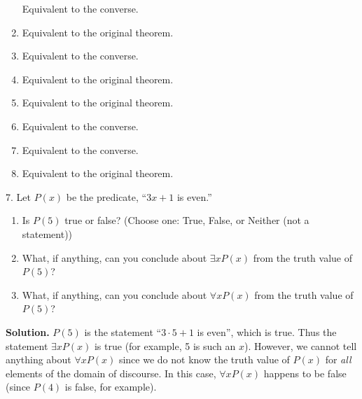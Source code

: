 \documentclass[10pt,]{book}
\theoremstyle{plain}
\theoremstyle{definition}
\theoremstyle{definition}
\numberwithin{equation}{chapter}
\begin{document}
\begin{exerciselist}
\begin{enumerate}[label=(\alph*)]
Equivalent to the converse.%
\item\hypertarget{li-120}{}\hypertarget{p-233}{}%
Equivalent to the original theorem.%
\item\hypertarget{li-121}{}\hypertarget{p-234}{}%
Equivalent to the converse.%
\item\hypertarget{li-122}{}\hypertarget{p-235}{}%
Equivalent to the original theorem.%
\item\hypertarget{li-123}{}\hypertarget{p-236}{}%
Equivalent to the original theorem.%
\item\hypertarget{li-124}{}\hypertarget{p-237}{}%
Equivalent to the converse.%
\item\hypertarget{li-125}{}\hypertarget{p-238}{}%
Equivalent to the converse.%
\item\hypertarget{li-126}{}\hypertarget{p-239}{}%
Equivalent to the original theorem.%
\end{enumerate}
%
\par
\item[7.]\hypertarget{exercise-7}{}\noindent%
\hypertarget{p-240}{}%
Let \(P(x)\) be the predicate, ``\(3x+1\) is even.''%
\par
\hypertarget{p-241}{}%
\leavevmode%
\begin{enumerate}[label=(\alph*)]
\item\hypertarget{li-127}{}\hypertarget{p-242}{}%
Is \(P(5)\) true or false? (Choose one: True, False, or Neither (not a statement))%
\item\hypertarget{li-128}{}\hypertarget{p-243}{}%
What, if anything, can you conclude about \(\exists x P(x)\) from the truth value of \(P(5)\)?%
\par
\hypertarget{p-244}{}%
\par
\begin{itemize}[label=$\odot$,leftmargin=3em,]
\end{itemize}
%
\item\hypertarget{li-129}{}\hypertarget{p-245}{}%
What, if anything, can you conclude about \(\forall x P(x)\) from the truth value of \(P(5)\)?%
\par
\hypertarget{p-246}{}%
\par
\begin{itemize}[label=$\odot$,leftmargin=3em,]
\end{itemize}
%
\end{enumerate}
%
\par
\medskip\noindent%
\textbf{Solution.}\quad \hypertarget{p-247}{}%
\(P(5)\) is the statement ``\(3\cdot 5 + 1\) is even'', which is true.  Thus the statement \(\exists x P(x)\) is true (for example, 5 is such an \(x\)).  However, we cannot tell anything about \(\forall x P(x)\) since we do not know the truth value of \(P(x)\) for \emph{all} elements of the domain of discourse.  In this case, \(\forall x P(x)\) happens to be false (since \(P(4)\) is false, for example).%

\end{exerciselist}
\end{document}

